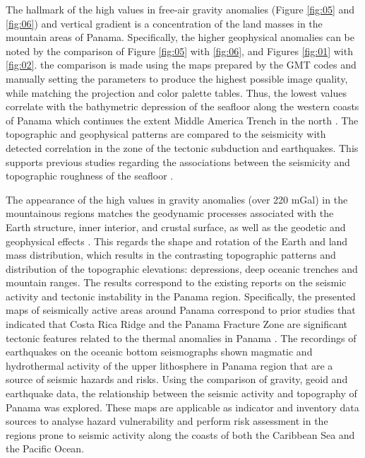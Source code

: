 \documentclass[USenglish,twocolumn]{article}
\begin{document}
The hallmark of the high values in free-air gravity anomalies (Figure \ref{fig:05} and \ref{fig:06}) and vertical gradient is a concentration of the land masses in the mountain areas of Panama. Specifically, the higher geophysical anomalies can be noted by the comparison of Figure \ref{fig:05} with \ref{fig:06}, and Figures \ref{fig:01} with \ref{fig:02}. the comparison is made using the maps prepared by the GMT codes and manually setting the parameters to produce the highest possible image quality, while matching the projection and color palette tables. Thus, the lowest values correlate with the bathymetric depression of the seafloor along the western coasts of Panama which continues the extent Middle America Trench in the north \cite{Lemenkova2019108}. The topographic and geophysical patterns are compared to the seismicity with detected correlation in the zone of the tectonic subduction and earthquakes. This supports previous studies regarding the associations between the seismicity and topographic roughness of the seafloor \cite{Bilek}.

The appearance of the high values in gravity anomalies (over 220 mGal) in the mountainous regions matches the geodynamic processes associated with the Earth structure, inner interior, and crustal surface, as well as the geodetic and geophysical effects \cite{Lemenkova202104}. This regards the shape and rotation of the Earth and land mass distribution, which results in the contrasting topographic patterns and distribution of the topographic elevations: depressions, deep oceanic trenches and  mountain ranges. The results correspond to the existing reports on the seismic activity and tectonic instability in the Panama region. Specifically, the presented maps of seismically active areas around Panama correspond to prior studies that indicated that Costa Rica Ridge and the Panama Fracture Zone are significant tectonic features related to the thermal anomalies in Panama \cite{Vargas}. The recordings of earthquakes on the oceanic bottom seismographs shown magmatic and hydrothermal activity of the upper lithosphere in Panama region that are a source of seismic hazards and risks. Using the comparison of gravity, geoid and earthquake data, the relationship between the seismic activity and topography of Panama was explored. These maps are applicable as indicator and inventory data sources to analyse hazard vulnerability and perform risk assessment in the regions prone to seismic activity along the coasts of both the Caribbean Sea and the Pacific Ocean. 
\end{document}
